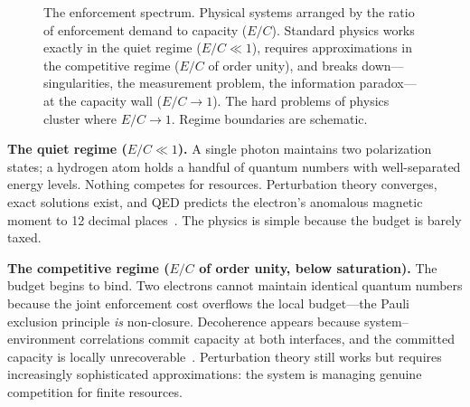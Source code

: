 \documentclass[11pt]{article}
\theoremstyle{remark}
\begin{document}
\begin{figure}[ht]

\medskip
\caption{The enforcement spectrum.  Physical systems arranged by the ratio of enforcement demand to capacity ($E/C$).  Standard physics works exactly in the quiet regime ($E/C \ll 1$), requires approximations in the competitive regime ($E/C$ of order unity), and breaks down---singularities, the measurement problem, the information paradox---at the capacity wall ($E/C \to 1$).  The hard problems of physics cluster where $E/C \to 1$.  Regime boundaries are schematic.}
\label{fig:spectrum}
\end{figure}

\medskip\noindent\textbf{The quiet regime ($E/C \ll 1$).}
A single photon maintains two polarization states; a hydrogen atom holds a handful of quantum numbers with well-separated energy levels.  Nothing competes for resources.  Perturbation theory converges, exact solutions exist, and QED predicts the electron's anomalous magnetic moment to 12 decimal places~\cite{Aoyama2020}.  The physics is simple because the budget is barely taxed.

\medskip\noindent\textbf{The competitive regime ($E/C$ of order unity, below saturation).}
The budget begins to bind.  Two electrons cannot maintain identical quantum numbers because the joint enforcement cost overflows the local budget---the Pauli exclusion principle \emph{is} non-closure.  Decoherence appears because system--environment correlations commit capacity at both interfaces, and the committed capacity is locally unrecoverable~\cite{Zurek2003}.  Perturbation theory still works but requires increasingly sophisticated approximations: the system is managing genuine competition for finite resources.
\end{document}
